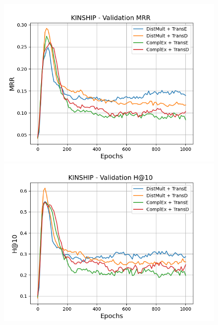 \begin{figure}
    \centering
    \begin{minipage}{.5\textwidth}
      \centering
      \includegraphics[width=\linewidth]{figures/results/gan_train/not_pretrained/random/kinship/1k_epochs/random_kinship_mrrs.png}
    \end{minipage}%
    \begin{minipage}{.5\textwidth}
      \centering
      \includegraphics[width=\linewidth]{figures/results/gan_train/not_pretrained/random/kinship/1k_epochs/random_kinship_hit10.png}
    \end{minipage}
    

\end{figure}

